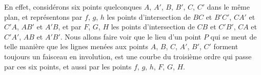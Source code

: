 \documentclass[12pt,a4paper]{article}
\begin{document}
En effet, consid\'erons six points quelconques $A$, $A'$, $B$, $B'$, $C$, $C'$ dans le m\^eme plan, et repr\'esentons par $f$, $g$, $h$ les points d'intersection de $BC$ et $B'C'$, $CA'$ et $C'A$, $AB'$ et $A'B$, et par $F$, $G$, $H$ les points d'intersection de $CB$ et $C'B'$, $CA$ et $C'A'$, $AB$ et $A'B'$. Nous allons faire voir que le lieu d'un point $P$ qui se meut de telle mani\`ere que les lignes men\'ees aux points $A$, $B$, $C$, $A'$, $B'$, $C'$ forment toujours un faisceau en involution, est une courbe du troisi\`eme ordre qui passe par ces six points, et aussi par les points $f$, $g$, $h$, $F$, $G$, $H$.

\newpage
\setcounter{page}{185}
\end{document}
